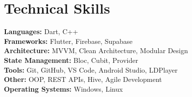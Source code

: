 \documentclass[letterpaper,11pt]{article}
\begin{document}
\section{Technical Skills}
\small{
\textbf{Languages:} Dart, C++ \\
\textbf{Frameworks:} Flutter, Firebase, Supabase \\
\textbf{Architecture:} MVVM, Clean Architecture, Modular Design \\
\textbf{State Management:} Bloc, Cubit, Provider \\
\textbf{Tools:} Git, GitHub, VS Code, Android Studio, LDPlayer \\
\textbf{Other:} OOP, REST APIs, Hive, Agile Development \\
\textbf{Operating Systems:} Windows, Linux
}
\end{document}
